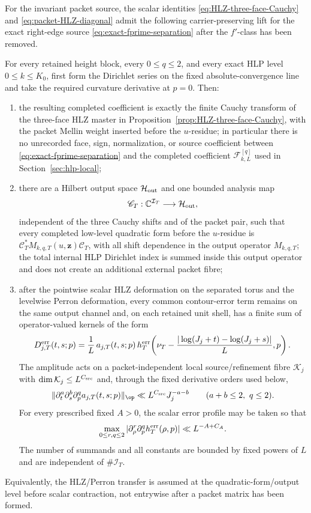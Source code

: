 \begin{hypothesis}
\label{hyp:packet-bilinear-HLZ}
For the invariant packet source, the scalar identities
\eqref{eq:HLZ-three-face-Cauchy} and
\eqref{eq:packet-HLZ-diagonal} admit the following carrier-preserving lift for
the exact right-edge source \eqref{eq:exact-fprime-separation} after the
$f'$-class has been removed.

For every retained height block, every $0\le q\le2$, and every exact HLP level
$0\le k\le K_0$, first form the Dirichlet series on the fixed
absolute-convergence line and take the required curvature derivative at
$p=0$.  Then:
\begin{enumerate}[label=(\roman*)]
\item the resulting completed coefficient is exactly the finite Cauchy transform
of the three-face HLZ master in Proposition~\ref{prop:HLZ-three-face-Cauchy},
with the packet Mellin weight inserted before the $u$-residue; in particular
there is no unrecorded face, sign, normalization, or source coefficient between
\eqref{eq:exact-fprime-separation} and the completed coefficient
$\mathcal F_{k,L}^{[q]}$ used in Section~\ref{sec:hlp-local};
\item there are a Hilbert output space $\mathcal H_{\rm out}$ and one bounded
analysis map
\[
\mathscr C_T:\mathbb C^{\mathcal I_T}\longrightarrow\mathcal H_{\rm out},
\]
independent of the three Cauchy shifts and of the packet pair, such that every
completed low-level quadratic form before the $u$-residue is
$\mathscr C_T^*M_{k,q,T}(u,\mathbf z)\mathscr C_T$, with all shift dependence
in the output operator $M_{k,q,T}$; the total internal HLP Dirichlet index is
summed inside this output operator and does not create an additional external
packet fibre;
\item after the pointwise scalar HLZ deformation on the separated torus and the
levelwise Perron deformation, every common contour-error term remains on the
same output channel and, on each retained unit shell, has a finite sum of
operator-valued kernels of the form
\begin{equation}
D_{j,T}^{\rm err}(t,s;p)
=\frac1L\,a_{j,T}(t,s;p)\,
 h_{T}^{\rm err}\!\left(\nu_T-\frac{|\log(J_j+t)-\log(J_j+s)|}{L},p\right).
\label{eq:hyp-common-error-kernel}
\end{equation}
The amplitude acts on a packet-independent local source/refinement fibre
$\mathcal K_j$ with $\dim\mathcal K_j\le L^{C_{\rm src}}$ and, through the
fixed derivative orders used below,
\[
\|\partial_t^a\partial_s^b\partial_p^q a_{j,T}(t,s;p)\|_{\op}
\ll L^{C_{\rm src}}J_j^{-a-b}
\qquad(a+b\le2,\ q\le2).
\]
For every prescribed fixed $A>0$, the scalar error profile may be taken so that
\[
\max_{0\le r,q\le2}
|\partial_\rho^r\partial_p^q h_T^{\rm err}(\rho,p)|
\ll L^{-A+C_A}.
\]
The number of summands and all constants are bounded by fixed powers of $L$ and
are independent of $\#\mathcal I_T$.
\end{enumerate}
Equivalently, the HLZ/Perron transfer is assumed at the quadratic-form/output
level before scalar contraction, not entrywise after a packet matrix has been
formed.
\end{hypothesis}

